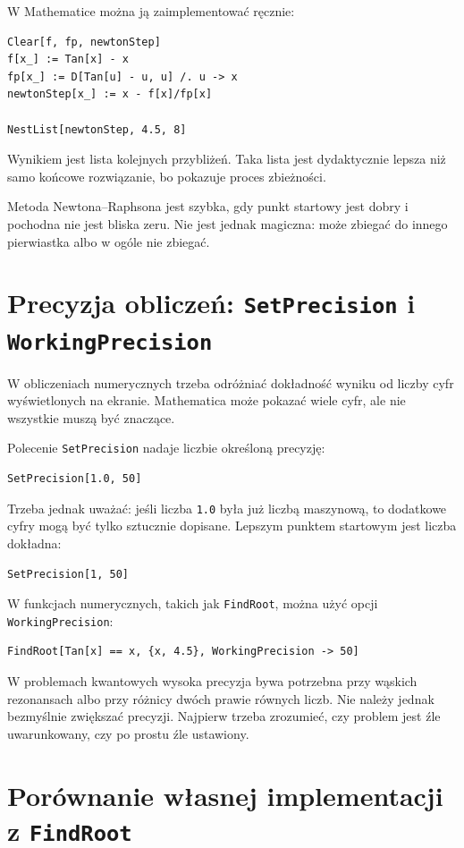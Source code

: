 W Mathematice można ją zaimplementować ręcznie:
\begin{verbatim}
Clear[f, fp, newtonStep]
f[x_] := Tan[x] - x
fp[x_] := D[Tan[u] - u, u] /. u -> x
newtonStep[x_] := x - f[x]/fp[x]

NestList[newtonStep, 4.5, 8]
\end{verbatim}
Wynikiem jest lista kolejnych przybliżeń. Taka lista jest dydaktycznie lepsza niż samo końcowe rozwiązanie, bo pokazuje proces zbieżności.

\begin{summarybox}
Metoda Newtona--Raphsona jest szybka, gdy punkt startowy jest dobry i pochodna nie jest bliska zeru. Nie jest jednak magiczna: może zbiegać do innego pierwiastka albo w ogóle nie zbiegać.
\end{summarybox}

\section{Precyzja obliczeń: \texttt{SetPrecision} i \texttt{WorkingPrecision}}

W obliczeniach numerycznych trzeba odróżniać dokładność wyniku od liczby cyfr wyświetlonych na ekranie. Mathematica może pokazać wiele cyfr, ale nie wszystkie muszą być znaczące.

Polecenie \texttt{SetPrecision} nadaje liczbie określoną precyzję:
\begin{verbatim}
SetPrecision[1.0, 50]
\end{verbatim}
Trzeba jednak uważać: jeśli liczba \texttt{1.0} była już liczbą maszynową, to dodatkowe cyfry mogą być tylko sztucznie dopisane. Lepszym punktem startowym jest liczba dokładna:
\begin{verbatim}
SetPrecision[1, 50]
\end{verbatim}

W funkcjach numerycznych, takich jak \texttt{FindRoot}, można użyć opcji \texttt{WorkingPrecision}:
\begin{verbatim}
FindRoot[Tan[x] == x, {x, 4.5}, WorkingPrecision -> 50]
\end{verbatim}
W problemach kwantowych wysoka precyzja bywa potrzebna przy wąskich rezonansach albo przy różnicy dwóch prawie równych liczb. Nie należy jednak bezmyślnie zwiększać precyzji. Najpierw trzeba zrozumieć, czy problem jest źle uwarunkowany, czy po prostu źle ustawiony.

\section{Porównanie własnej implementacji z \texttt{FindRoot}}

